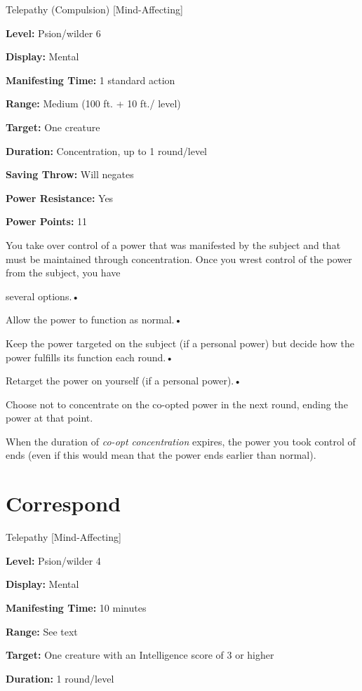 \documentclass{article}
\begin{document}
Telepathy (Compulsion) [Mind-Affecting]

\textbf{Level:} Psion/wilder 6

\textbf{Display:} Mental

\textbf{Manifesting Time:} 1 standard action

\textbf{Range:} Medium (100 ft. + 10 ft./ level)

\textbf{Target:} One creature

\textbf{Duration:} Concentration, up to 1 round/level

\textbf{Saving Throw:} Will negates

\textbf{Power Resistance:} Yes

\textbf{Power Points:} 11

You take over control of a power that was manifested by the subject and that must 
be maintained through concentration. Once you wrest control of the power from the 
subject, you have

several options.• 

\parindent=3pt
Allow the power to function as normal.• 

Keep the power targeted on the subject (if a personal power) but decide how the 
power fulfills its function each round.• 

\parindent=7pt
Retarget the power on yourself (if a personal power).• 

\parindent=3pt
Choose not to concentrate on the co-opted power in the next round, ending the power 
at that point.

\parindent=0pt
When the duration of \textit{co-opt concentration }expires, the power you took 
control of ends (even if this would mean that the power ends earlier than normal).

\vspace{12pt}
\section*{Correspond}

Telepathy [Mind-Affecting]

\textbf{Level:} Psion/wilder 4

\textbf{Display:} Mental

\textbf{Manifesting Time:} 10 minutes

\textbf{Range:} See text

\textbf{Target:} One creature with an Intelligence score of 3 or higher

\textbf{Duration:} 1 round/level
\end{document}
